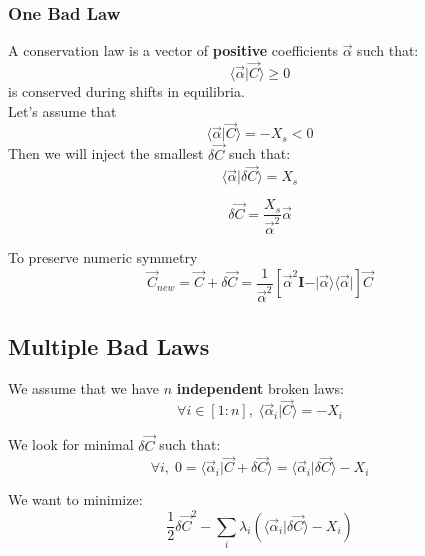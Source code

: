 \documentclass[aps,12pt]{revtex4}
\begin{document}
\subsubsection{One Bad Law}
A conservation law is a vector of {\bf positive} coefficients $\vec \alpha$ such that:
\begin{equation}
	\langle \vec \alpha \vert \vec C \rangle \geq 0
\end{equation}
is conserved during shifts in equilibria.\\
Let's assume that
\begin{equation}
	\langle \vec \alpha \vert \vec C \rangle = -X_s < 0 
\end{equation}
Then we will inject the smallest $\delta \vec C$ such that:
\begin{equation}
	\langle \vec \alpha \vert \delta \vec C \rangle = X_s
\end{equation}

\begin{equation}
	\delta \vec C = \dfrac{X_s}{\vec\alpha^2} \vec{\alpha}
\end{equation}

To preserve numeric symmetry
\begin{equation}
	\vec C_{new} = \vec C + \delta \vec C = \dfrac{1}{\vec \alpha^2}\left[\vec \alpha^2 \bm{I} - \vert \vec \alpha \rangle \langle \vec \alpha \vert \right] \vec C
\end{equation}

\subsection{Multiple Bad Laws}

We assume that we have $n$ {\bf independent} broken laws:
\begin{equation}
	\forall i \in [1:n], \; \langle \vec \alpha_i \vert \vec C \rangle = -X_i
\end{equation} 	

We look for minimal $\delta \vec C$ such that:
\begin{equation}
	\forall i, \; 0 =  \langle \vec \alpha_i \vert \vec C + \delta \vec C\rangle = \langle \vec \alpha_i \vert \delta \vec C \rangle -X_i
\end{equation}

We want to minimize:
\begin{equation}
	\dfrac{1}{2} \delta \vec C ^2 - \sum_i \lambda_i \left( \langle \vec \alpha_i \vert \delta \vec C \rangle -X_i \right) 
\end{equation}
\end{document}

